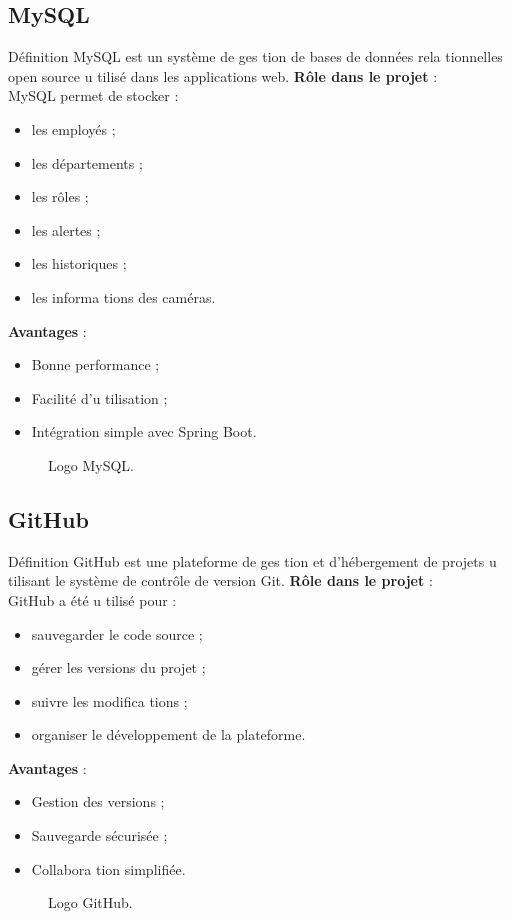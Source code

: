 \documentclass[12pt,a4paper]{report}
\numberwithin{figure}{chapter}
\numberwithin{table}{chapter}
\begin{document}
\subsection{MySQL}
Déﬁnition
MySQL est un système de ges tion de bases de données rela tionnelles open source u tilisé dans les
applications web.
\textbf{Rôle dans le projet} : \\
MySQL permet de stocker :
\begin{itemize}
  \item les employés ;
  \item les départements ;
  \item les rôles ;
  \item les alertes ;
  \item les historiques ;
  \item les informa tions des caméras.
\end{itemize}
\textbf{Avantages} : \\
\begin{itemize}
  \item Bonne performance ;
  \item Facilité d’u tilisation ;
  \item Intégration simple avec Spring Boot.
\end{itemize}
\begin{figure}[H]
  \centering
  \caption{Logo MySQL.}
\end{figure}
\subsection{GitHub}
Déﬁnition
GitHub est une plateforme de ges tion et d’hébergement de projets u tilisant le système de contrôle de
version Git.
\textbf{Rôle dans le projet} : \\
GitHub a été u tilisé pour :
\begin{itemize}
  \item sauvegarder le code source ;
  \item gérer les versions du projet ;
  \item suivre les modiﬁca tions ;
  \item organiser le développement de la plateforme.
\end{itemize}
\textbf{Avantages} : \\
\begin{itemize}
  \item Gestion des versions ;
  \item Sauvegarde sécurisée ;
  \item Collabora tion simpliﬁée.
\end{itemize}
\begin{figure}[H]
  \centering
  \caption{Logo GitHub.}
\end{figure}
\end{document}
